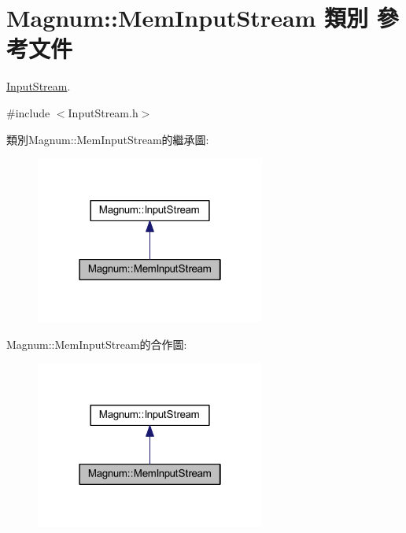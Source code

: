 \hypertarget{class_magnum_1_1_mem_input_stream}{}\section{Magnum\+:\+:Mem\+Input\+Stream 類別 參考文件}
\label{class_magnum_1_1_mem_input_stream}


\hyperlink{class_magnum_1_1_input_stream}{Input\+Stream}.  




{\ttfamily \#include $<$Input\+Stream.\+h$>$}



類別\+Magnum\+:\+:Mem\+Input\+Stream的繼承圖\+:\nopagebreak
\begin{figure}[H]
\begin{center}
\leavevmode
\includegraphics[width=214pt]{class_magnum_1_1_mem_input_stream__inherit__graph}
\end{center}
\end{figure}


Magnum\+:\+:Mem\+Input\+Stream的合作圖\+:\nopagebreak
\begin{figure}[H]
\begin{center}
\leavevmode
\includegraphics[width=214pt]{class_magnum_1_1_mem_input_stream__coll__graph}
\end{center}
\end{figure}
